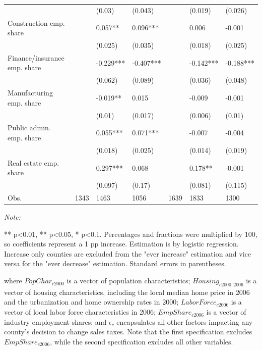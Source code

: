 \documentclass[]{article}
\begin{document}
\begin{table}
\begin{threeparttable}
\begin{tabular}[t]{lllllll}
 &  & (0.03) & (0.043) &  & (0.019) & (0.026)\\
Construction emp. share &  & 0.057** & 0.096*** &  & 0.006 & -0.001\\
 &  & (0.025) & (0.035) &  & (0.018) & (0.025)\\
Finance/insurance emp. share &  & -0.229*** & -0.407*** &  & -0.142*** & -0.188***\\
\addlinespace
 &  & (0.062) & (0.089) &  & (0.036) & (0.048)\\
Manufacturing emp. share &  & -0.019** & 0.015 &  & -0.009 & -0.001\\
 &  & (0.01) & (0.017) &  & (0.006) & (0.01)\\
Public admin. emp. share &  & 0.055*** & 0.071*** &  & -0.007 & -0.004\\
 &  & (0.018) & (0.025) &  & (0.014) & (0.019)\\
\addlinespace
Real estate emp. share &  & 0.297*** & 0.068 &  & 0.178** & -0.001\\
 &  & (0.097) & (0.17) &  & (0.081) & (0.115)\\
\hline
Obs. & 1343 & 1463 & 1056 & 1639 & 1833 & 1300\\
\bottomrule
\end{tabular}
\begin{tablenotes}
\item \textit{Note: } 
\item *** p<0.01, ** p<0.05, * p<0.1. Percentages and fractions were multiplied by 100, so coefficients represent a 1 pp increase. Estimation is by logistic regression. Increase only counties are excluded from the "ever increase" estimation and vice versa for the "ever decrease" estimation. Standard errors in parentheses.
\end{tablenotes}
\end{threeparttable}
\end{table}

where \(PopChar_{c2000}\) is a vector of population characteristics;
\(Housing_{c2000,2006}\) is a vector of housing characteristics,
including the local median home price in 2006 and the urbanization and
home ownership rates in 2000; \(LaborForce_{c2006}\) is a vector of
local labor force characteristics in 2006; \(EmpShare_{c2006}\) is a
vector of industry employment shares; and \(\epsilon_c\) encapsulates
all other factors impacting any county's decision to change sales taxes.
Note that the first specification excludes \(EmpShare_{c2006}\), while
the second specification excludes all other variables.
\end{document}
